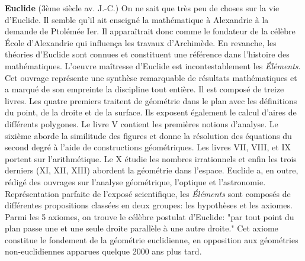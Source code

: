 \textbf{Euclide} (3ème siècle av. J.-C.) On ne sait que très peu de choses sur la vie d'Euclide. Il semble qu'il ait enseigné la mathématique à Alexandrie à la demande de Ptolémée Ier. Il apparaîtrait donc comme le fondateur de la célèbre École d'Alexandrie qui influença les travaux d'Archimède. En revanche, les théories d'Euclide sont connues et constituent une référence dans l'histoire des mathématiques. L'oeuvre maîtresse d'Euclide est incontestablement les \textit{Éléments}. Cet ouvrage représente une synthèse remarquable de résultats mathématiques et a marqué de son empreinte la discipline tout entière. Il est composé de treize livres. Les quatre premiers traitent de géométrie dans le plan avec les définitions du point, de la droite et de la surface. Ils exposent également le calcul d'aires de différents polygones. Le livre V contient les premières notions d'analyse. Le sixième aborde la similitude des figures et donne la résolution des équations du second degré à l'aide de constructions géométriques. Les livres VII, VIII, et IX portent sur l'arithmétique. Le X étudie les nombres irrationnels et enfin les trois derniers (XI, XII, XIII) abordent la géométrie dans l'espace. Euclide a, en outre, rédigé des ouvrages sur l'analyse géométrique, l'optique et l'astronomie. Représentation parfaite de l'exposé scientifique, les \textit{Éléments} sont composés de différentes propositions classées en deux groupes: les hypothèses et les axiomes. Parmi les 5 axiomes, on trouve le célèbre postulat d'Euclide: "par tout point du plan passe une et une seule droite parallèle à une autre droite." Cet axiome constitue le fondement de la géométrie euclidienne, en opposition aux géométries non-euclidiennes apparues quelque 2000 ans plus tard.


